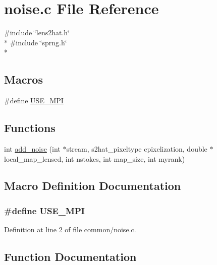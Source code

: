 \section{noise.\-c File Reference}
\label{common_2noise_8c}
{\ttfamily \#include \char`\"{}lens2hat.\-h\char`\"{}}\\*
{\ttfamily \#include \char`\"{}sprng.\-h\char`\"{}}\\*
\subsection*{Macros}
\begin{DoxyCompactItemize}
\item 
\#define \hyperlink{common_2noise_8c_a3869d282031f6ea6b50fdb980b758420}{U\-S\-E\-\_\-\-M\-P\-I}
\end{DoxyCompactItemize}
\subsection*{Functions}
\begin{DoxyCompactItemize}
\item 
int \hyperlink{common_2noise_8c_a3f684122a9649e75f6c303fd20a236a5}{add\-\_\-noise} (int $\ast$stream, s2hat\-\_\-pixeltype cpixelization, double $\ast$local\-\_\-map\-\_\-lensed, int nstokes, int map\-\_\-size, int myrank)
\end{DoxyCompactItemize}


\subsection{Macro Definition Documentation}
\subsubsection[{U\-S\-E\-\_\-\-M\-P\-I}]{\setlength{\rightskip}{0pt plus 5cm}\#define U\-S\-E\-\_\-\-M\-P\-I}\label{common_2noise_8c_a3869d282031f6ea6b50fdb980b758420}


Definition at line 2 of file common/noise.\-c.



\subsection{Function Documentation}
